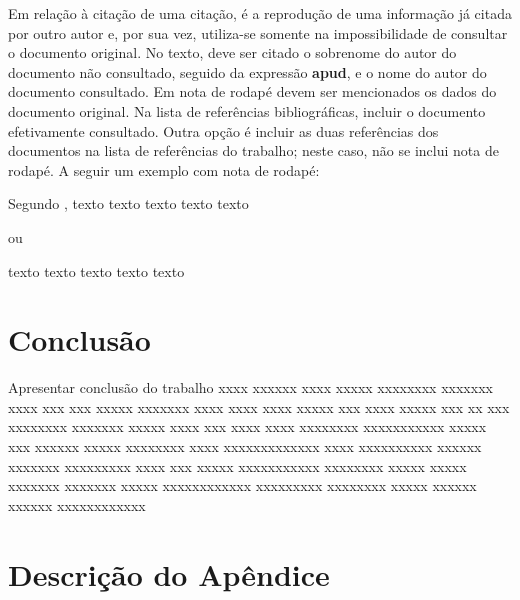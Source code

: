 \documentclass[ppgc,diss]{iiufrgs}
\begin{document}
Em relação à citação de uma citação, é a reprodução de uma informação já citada
por outro autor e, por sua vez, utiliza-se somente na impossibilidade de
consultar o documento original. No texto, deve ser citado o sobrenome do autor
do documento não consultado, seguido da expressão \textbf{apud}, e o nome do
autor do documento consultado. Em nota de rodapé devem ser mencionados os dados
do documento original. Na lista de referências bibliográficas, incluir o
documento efetivamente consultado. Outra opção é incluir as duas referências
dos documentos na lista de referências do trabalho; neste caso, não se inclui
nota de rodapé. A seguir um exemplo com nota de rodapé:


\begin{framed}
	Segundo , texto texto texto texto texto
\end{framed}

ou

\begin{framed}
	texto texto texto texto texto 
\end{framed}



\chapter{Conclusão}

Apresentar conclusão do trabalho xxxx xxxxxx xxxx xxxxx xxxxxxxx xxxxxxx xxxx
xxx xxx xxxxx xxxxxxx xxxx xxxx xxxx xxxxx xxx xxxx xxxxx xxx xx
xxx xxxxxxxx xxxxxxx xxxxx xxxx xxx xxxx xxxx
xxxxxxxx xxxxxxxxxxx xxxxx xxx xxxxxx xxxxx xxxxxxxx xxxx
xxxxxxxxxxxxx xxxx xxxxxxxxxx xxxxxx xxxxxxx xxxxxxxxx xxxx xxx
xxxxx xxxxxxxxxxx xxxxxxxx xxxxx xxxxx xxxxxxx xxxxxxx xxxxx
xxxxxxxxxxxx xxxxxxxxx xxxxxxxx xxxxx xxxxxx xxxxxx xxxxxxxxxxxx


\nocite{goncalves}
\nocite{lisboa}
\nocite{high}
\nocite{krieger}
\nocite{goncalves2}
\nocite{pedrosa}





\appendix

\chapter*{Descrição do Apêndice}
\end{document}
